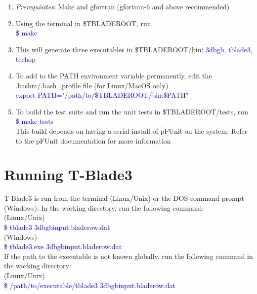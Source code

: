 \documentclass[8pt]{article}
\begin{document}
\begin{enumerate}[leftmargin=*]
    \item \textit{Prerequisites}: Make and gfortran (gfortran-6 and above recommended)
    \item Using the terminal in \$TBLADEROOT, run\\
          \textcolor{blue}{\selectfont \$ make}
    \item This will generate three executables in \$TBLADEROOT/bin: \textcolor{blue}{\selectfont 3dbgb, tblade3, techop}
    \item To add to the PATH environment variable permanently, edit the .bashrc/.bash\_profile file (for Linux/MacOS only)\\
          \textcolor{blue}{\selectfont export PATH="/path/to/\$TBLADEROOT/bin:\$PATH"}
    \item To build the test suite and run the unit tests in \$TBLADEROOT/tests, run\\
          \textcolor{blue}{\selectfont \$ make tests}\\
          This build depends on having a serial install of pFUnit on the system. Refer to the pFUnit documentation for more information
\end{enumerate}

\section{Running T-Blade3}

\noindent
T-Blade3 is run from the terminal (Linux/Unix) or the DOS command prompt (Windows). In the working directory, run the following command:\\

\noindent
(Linux/Unix)\\
\textcolor{blue}{{\selectfont \$ tblade3 3dbgbinput.bladerow.dat}}\\

\noindent
(Windows)\\
\textcolor{blue}{{\selectfont \$ tblade3.exe 3dbgbinput.bladerow.dat}}\\

\noindent
If the path to the executable is not known globally, run the following command in the working directory:\\

\noindent
(Linux/Unix)\\
\textcolor{blue}{{\selectfont \$ /path/to/executable/tblade3 3dbgbinput.bladerow.dat}}\\
\end{document}
